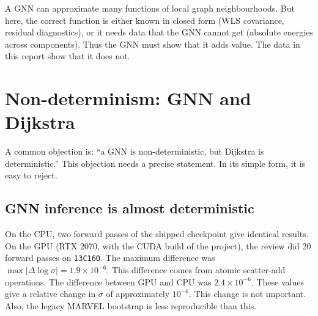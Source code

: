 \documentclass[11pt,a4paper]{article}
\newcommand{\code}[1]{\texttt{#1}}
\begin{document}
A GNN can approximate many functions of local graph neighbourhoods. But here, the
correct function is either known in closed form (WLS covariance, residual
diagnostics), or it needs data that the GNN cannot get (absolute energies across
components). Thus the GNN must show that it adds value. The data in this report show
that it does not.

\section{Non-determinism: GNN and Dijkstra}\label{sec:nondet}

A common objection is: ``a GNN is non-deterministic, but Dijkstra is deterministic.''
This objection needs a precise statement. In its simple form, it is easy to reject.

\subsection{GNN inference is almost deterministic}
On the CPU, two forward passes of the shipped checkpoint give identical results. On
the GPU (RTX 2070, with the CUDA build of the project), the review did 20 forward
passes on \code{13C16O}. The maximum difference was
$\max|\Delta\log\sigma| = 1.9\times10^{-6}$. This difference comes from atomic
scatter-add operations. The difference between GPU and CPU was $2.4\times10^{-6}$.
These values give a relative change in $\sigma$ of approximately $10^{-6}$. This change
is not important. Also, the legacy MARVEL bootstrap is less reproducible than this.
\end{document}
